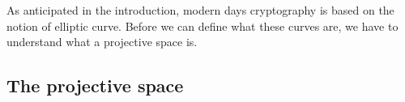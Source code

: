\documentclass{subfiles}
\begin{document}
\label{sec:crypto-on-elliptic-curves}
    As anticipated in the introduction,
        modern days cryptography is based on the notion of elliptic curve.
        Before we can define what these curves are,
        we have to understand what a projective space is.

    \subsection{The projective space}
    
\end{document}
